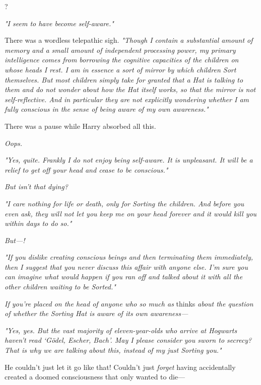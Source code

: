 
?

\emph{"I seem to have become self-aware."}

\emph{}

There was a wordless telepathic sigh. \emph{"Though I contain a substantial
amount of memory and a small amount of independent processing power, my primary
intelligence comes from borrowing the cognitive capacities of the children on
whose heads I rest. I am in essence a sort of mirror by which children Sort
themselves. But most children simply take for granted that a Hat is
talking to them and do not wonder about how the Hat itself works, so
that the mirror is not self-reflective. And in particular they
are not explicitly wondering whether I am fully conscious in the sense of
being aware of my own awareness."}

There was a pause while Harry absorbed all this.

\emph{Oops.}

\emph{"Yes, quite. Frankly I do not enjoy being self-aware. It is unpleasant.
It will be a relief to get off your head and cease to be conscious."}

\emph{But{\el} isn't that dying?}

\emph{"I care nothing for life or death, only for Sorting the children. And
before you even ask, they will not let you keep me on your head forever and it
would kill you within days to do so."}

\emph{But---!}

\emph{"If you dislike creating conscious beings and then terminating them
immediately, then I suggest that you never discuss this affair with anyone
else. I'm sure you can imagine what would happen if you ran off and talked
about it with all the other children waiting to be Sorted."}

\emph{If you're placed on the head of anyone who so much as} thinks \emph{about
the question of whether the Sorting Hat is aware of its own awareness---}

\emph{"Yes, yes. But the vast majority of eleven-year-olds who arrive at
Hogwarts haven't read `Gödel, Escher, Bach'. May I please consider you sworn to
secrecy? That is why we are talking about this, instead of my just
Sorting you."}

He couldn't just let it go like that! Couldn't just \emph{forget} having
accidentally created a doomed consciousness that only wanted to die\mbox{---}


